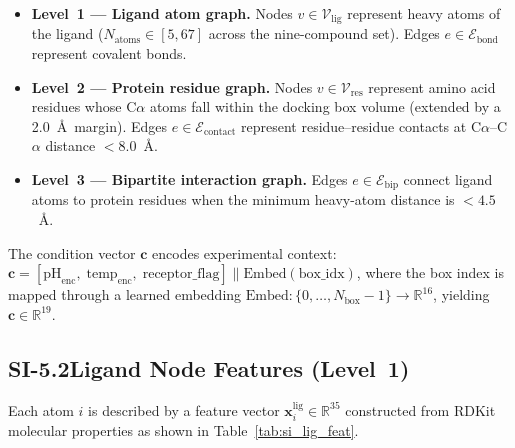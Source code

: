 \documentclass[11pt]{article}
\begin{document}
\begin{itemize}[leftmargin=1.5em]
  \item \textbf{Level~1 --- Ligand atom graph.}
    Nodes $v \in \mathcal{V}_{\mathrm{lig}}$ represent heavy atoms of the
    ligand ($N_{\mathrm{atoms}} \in [5, 67]$ across the nine-compound set).
    Edges $e \in \mathcal{E}_{\mathrm{bond}}$ represent covalent bonds.
  \item \textbf{Level~2 --- Protein residue graph.}
    Nodes $v \in \mathcal{V}_{\mathrm{res}}$ represent amino acid residues
    whose C$\alpha$ atoms fall within the docking box volume (extended by a
    2.0~\AA\ margin).
    Edges $e \in \mathcal{E}_{\mathrm{contact}}$ represent residue--residue
    contacts at C$\alpha$--C$\alpha$ distance $< 8.0$~\AA.
  \item \textbf{Level~3 --- Bipartite interaction graph.}
    Edges $e \in \mathcal{E}_{\mathrm{bip}}$ connect ligand atoms to
    protein residues when the minimum heavy-atom distance is
    $< 4.5$~\AA.
\end{itemize}

\noindent
The condition vector $\mathbf{c}$ encodes experimental context:
$\mathbf{c} = [\text{pH}_{\mathrm{enc}},\;\text{temp}_{\mathrm{enc}},\;
\text{receptor\_flag}] \| \text{Embed}(\text{box\_idx})$,
where the box index is mapped through a learned embedding
$\text{Embed}: \{0, \ldots, N_{\mathrm{box}}-1\} \to \mathbb{R}^{16}$,
yielding $\mathbf{c} \in \mathbb{R}^{19}$.

\subsection*{SI-5.2\quad Ligand Node Features (Level~1)}

Each atom $i$ is described by a feature vector
$\mathbf{x}_i^{\mathrm{lig}} \in \mathbb{R}^{35}$ constructed from
RDKit molecular properties as shown in Table~\ref{tab:si_lig_feat}.
\end{document}

